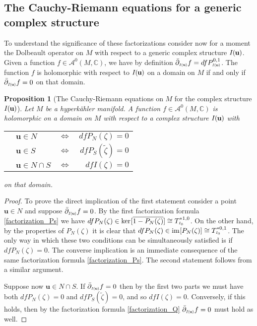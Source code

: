 \documentclass[11pt]{amsart}
\newtheorem{proposition}[theorem]{Proposition}
\theoremstyle{remark}
\theoremstyle{remark}
\theoremstyle{definition}
\theoremstyle{definition}
\theoremstyle{definition}
\newcommand{\IU}{I\nhp(\nhp\mathbf{u}\hspace{-0.2pt})} %
\newcommand{\Iu}{\scriptscriptstyle{I\nhp(\nhp\mathbf{u}\hspace{-0.25pt})}} %
\newcommand{\Io}{{\scriptscriptstyle I_0}}
\newcommand{\0}{{\scriptstyle 0'}} %
\newcommand{\1}{{\scriptstyle 1'}}
\newcommand{\hp}{\hspace{0.5pt}} %
\newcommand{\nhp}{\hspace{-0.5pt}} %
\begin{document}
\subsection{The Cauchy-Riemann equations for a generic complex structure} \hfill \medskip


To understand the significance of these factorizations consider now for a moment the Dolbeault operator on $M$ with respect to a generic complex structure $\IU$. Given a function $f \in \mathscr{A}^0(M,\mathbb{C})$, we have by definition $\bar{\partial}_{\Iu} f = df P^{0,1}_{\Iu}$. The function $f$ is holomorphic with respect to $\IU$ on a domain on $M$ if and only if $\bar{\partial}_{\Iu} f = 0$ on that domain. %

\begin{proposition}[The Cauchy-Riemann equations on $M$ for the complex structure $\IU$] \label{CR_M}
Let $M$ be a hyperk\"ahler manifold. A function $f \in \mathscr{A}^0(M,\mathbb{C})$ is holomorphic on a domain on $M$ with respect to a complex structure $\IU$ with
\begin{flushleft}
\begin{tabular}{llcr}
\hspace{10pt} & $\mathbf{u} \in N$ & $\Leftrightarrow$ & $df P_N(\zeta) = 0$ \\[2pt]
& $\mathbf{u} \in S$ & $\Leftrightarrow$ & $df P_S(\tilde{\zeta}) = 0$ \\[2.5pt]
& $\mathbf{u} \in N \cap S$ & $\Leftrightarrow$ & $df I(\zeta) = 0$
\end{tabular}
\end{flushleft}
on that domain.
\end{proposition}

\begin{proof}

To prove the direct implication of the first statement consider a point $\mathbf{u} \in N$ and suppose $\bar{\partial}_{\Iu} f = 0$. By the first factorization formula \eqref{factorization_Ps} we have $df P_N(\zeta) \in \text{ker}\hp [\overline{1-P_N(\zeta)}] \allowbreak \cong T^{*1,0}_{\Io}$. On the other hand, by the properties of $P_N(\zeta)$ it is clear that ${df P_N(\zeta) \in \text{im} \hp [P_N(\zeta)]} \allowbreak \cong T^{*0,1}_{\Io}$. The only way in which these two conditions can be simultaneously satisfied is if $df P_N(\zeta) = 0$. The converse implication is an immediate consequence of the same factorization formula \eqref{factorization_Ps}. The second statement follows from a similar argument. 

Suppose now $\mathbf{u} \in N \cap S$. If $\bar{\partial}_{\Iu} f = 0$ then by the first two parts we must have both $df P_N(\zeta) = 0$ and $df P_S(\tilde{\zeta}) = 0$, and so $df I(\zeta) = 0$. Conversely, if this holds, then by the factorization formula \eqref{factorization_Q} $\bar{\partial}_{\Iu} f = 0$ must hold as well. 
\end{proof}
\end{document}
